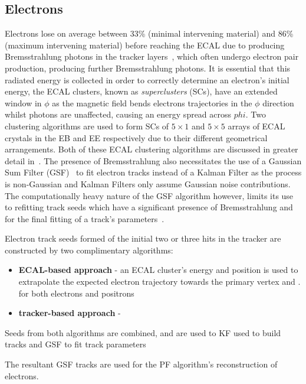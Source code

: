 \subsection{Electrons}\label{subsec:electrons}
Electrons lose on average between 33\% (minimal intervening material) and 86\% (maximum intervening material) before reaching the ECAL due to producing Bremsstrahlung photons in the tracker layers~\cite{Khachatryan:2015hwa}, which often undergo electron pair production, producing further Bremsstrahlung photons.	
It is essential that this radiated energy is collected in order to correctly determine an electron's initial energy, the ECAL clusters, known as \emph{superclusters} (SCs), have an extended window in $\phi$ as the magnetic field bends electrons trajectories in the $\phi$ direction whilst photons are unaffected, causing an energy spread across $phi$.
Two clustering algorithms are used to form SCs of $5 \times 1$ and $5 \times 5$ arrays of ECAL crystals in the EB and EE respectively due to their different geometrical arrangements.
Both of these ECAL clustering algorithms are discussed in greater detail in~\cite{Khachatryan:2015hwa}.
The presence of Bremsstrahlung also necessitates the use of a Gaussian Sum Filter (GSF)~\cite{Adam:2003eca} to fit electron tracks instead of a Kalman Filter as the process is non-Gaussian and Kalman Filters only assume Gaussian noise contributions.
The computationally heavy nature of the GSF algorithm however, limits its use to refitting \KF track seeds which have a significant presence of Bremsstrahlung and for the final fitting of a track's parameters~\cite{Khachatryan:2015hwa}.

Electron track seeds formed of the initial two or three hits in the tracker are constructed by two complimentary algorithms:
\begin{itemize}
\item \textbf{ECAL-based approach} - an ECAL cluster's energy and position is used to extrapolate the expected electron trajectory towards the primary vertex and . 
for both electrons and positrons 
\item \textbf{tracker-based approach} - 
\end{itemize}

Seeds from both algorithms are combined, and are used to 
KF used to build tracks and GSF to fit track parameters

The resultant GSF tracks are used for the PF algorithm's reconstruction of electrons.

